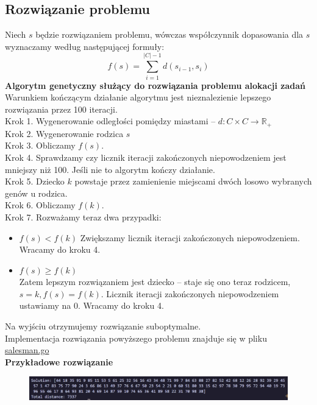 \documentclass{article}
\begin{document}
	\subsection{Rozwiązanie problemu}
	Niech $s$ będzie rozwiązaniem problemu, wówczas współczynnik dopasowania dla
	$s$ wyznaczamy według następującej formuły:
	\[
		f(s)=\sum_{i=1}^{|C|-1}d(s_{i-1},s_{i})
	\]
	\textbf{Algorytm genetyczny służący do rozwiązania problemu alokacji zadań}\\ Warunkiem
	kończącym działanie algorytmu jest nieznalezienie lepszego rozwiązania przez 100
	iteracji.\\ Krok 1. Wygenerowanie odległości pomiędzy miastami --
	$d:C\times C\rightarrow \mathbb{R_+}$\\ Krok 2. Wygenerowanie rodzica $s$\\
	Krok 3. Obliczamy $f(s)$.\\ Krok 4. Sprawdzamy czy licznik iteracji
	zakończonych niepowodzeniem jest mniejszy niż 100. Jeśli nie to algorytm
	kończy działanie.\\ Krok 5. Dziecko $k$ powstaje przez zamienienie miejscami
	dwóch losowo wybranych genów u rodzica.\\ Krok 6. Obliczamy $f(k)$.\\ Krok 7.
	Rozważamy teraz dwa przypadki:
	\begin{itemize}
		\item $f(s) < f(k)$ Zwiększamy licznik iteracji zakończonych niepowodzeniem.
			Wracamy do kroku 4.

		\item $f(s)\geq f(k)$\\ Zatem lepszym rozwiązaniem jest dziecko -- staje się
			ono teraz rodzicem, $s=k, f(s)=f(k)$. Licznik iteracji zakończonych niepowodzeniem
			ustawiamy na 0. Wracamy do kroku 4.
	\end{itemize}
	Na wyjściu otrzymujemy rozwiązanie suboptymalne.\\ Implementacja rozwiązania powyższego
	problemu znajduje się w pliku \href{https://github.com/Kaniek99/AIbasics/blob/main/src/salesman/salesman.go}{salesman.go}\\
	\textbf{Przykładowe rozwiązanie}\\
	\begin{figure}[h]
		\includegraphics[width=\linewidth]{salesman_example.png}
	\end{figure}
\end{document}
